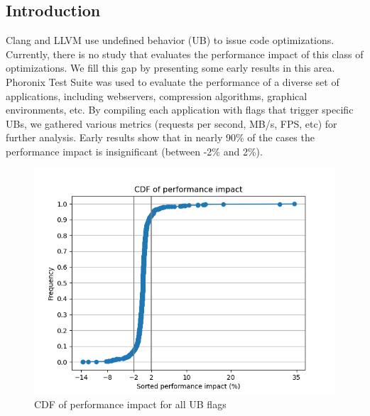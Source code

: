 \documentclass{sciposter}
\begin{document}
\begin{multicols}{3}

\section{Introduction}
Clang and LLVM use undefined behavior (UB) to issue code optimizations.
Currently, there is no study that evaluates the performance impact of this class
of optimizations. We fill this gap by presenting some early results in this
area. Phoronix Test Suite was used to evaluate the performance of a diverse set
of applications, including webservers, compression algorithms, graphical
environments, etc. By compiling each application with flags that trigger
specific UBs, we gathered various metrics (requests per second, MB/s, FPS,
etc) for further analysis. Early results show that in nearly 90\% of the cases
the performance impact is insignificant (between -2\% and 2\%).
\begin{figure}[h!]
\centering
\includegraphics[scale=1.2]{perf-cdf}
\caption{CDF of performance impact for all UB flags}
\end{figure}


\end{multicols}
\end{document}
